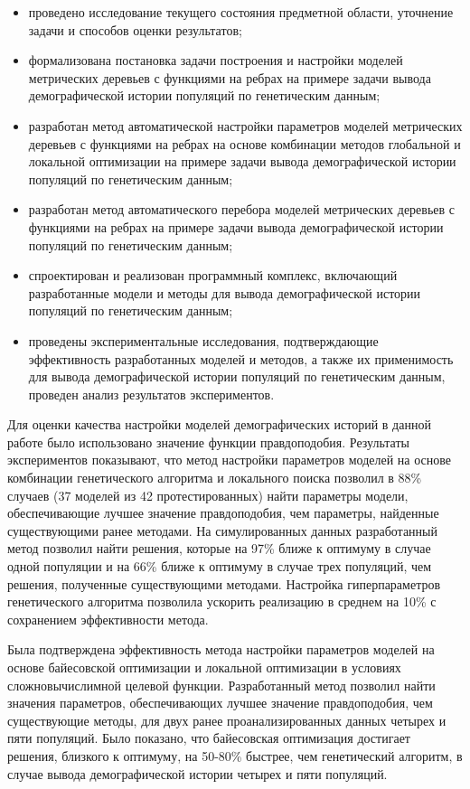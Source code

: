 \begin{itemize}
    \item проведено исследование текущего состояния предметной области, уточнение задачи и способов оценки результатов;
    \item формализована постановка задачи построения и настройки моделей метрических деревьев с функциями на ребрах на примере задачи вывода демографической истории популяций по генетическим данным;
    \item разработан метод автоматической настройки параметров моделей метрических деревьев с функциями на ребрах на основе комбинации методов глобальной и локальной оптимизации на примере задачи вывода демографической истории популяций по генетическим данным;
    \item разработан метод автоматического перебора моделей метрических деревьев с функциями на ребрах на примере задачи вывода демографической истории популяций по генетическим данным;
    \item спроектирован и реализован программный комплекс, включающий разработанные модели и методы для вывода демографической истории популяций по генетическим данным;
    \item проведены экспериментальные исследования, подтверждающие эффективность разработанных моделей и методов, а также их применимость для вывода демографической истории популяций по генетическим данным, проведен анализ результатов экспериментов.\\
\end{itemize}

Для оценки качества настройки моделей демографических историй в данной работе было использовано значение функции правдоподобия.
Результаты экспериментов показывают, что метод настройки параметров моделей на основе комбинации генетического алгоритма и локального поиска позволил в 88\% случаев (37 моделей из 42 протестированных) найти параметры модели, обеспечивающие лучшее значение правдоподобия, чем параметры, найденные существующими ранее методами.
На симулированных данных разработанный метод позволил найти решения, которые на 97\% ближе к оптимуму в случае одной популяции и на 66\% ближе к оптимуму в случае трех популяций, чем решения, полученные существующими методами.
Настройка гиперпараметров генетического алгоритма позволила ускорить реализацию в среднем на 10\% с сохранением эффективности метода.

Была подтверждена эффективность метода настройки параметров моделей на основе байесовской оптимизации и локальной оптимизации в условиях сложновычислимной целевой функции.
Разработанный метод позволил найти значения параметров, обеспечивающих лучшее значение правдоподобия, чем существующие методы, для двух ранее проанализированных данных четырех и пяти популяций.
Было показано, что байесовская оптимизация достигает решения, близкого к оптимуму, на 50-80\% быстрее, чем генетический алгоритм, в случае вывода демографической истории четырех и пяти популяций.


